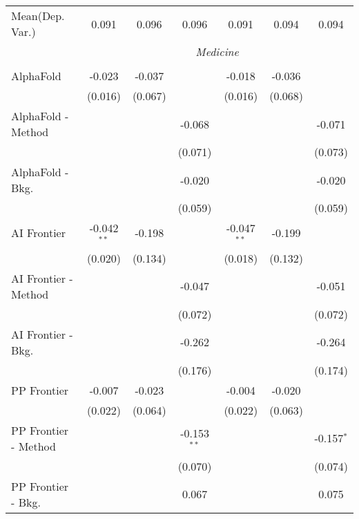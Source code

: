 \begin{tabular}{lcccccc}
Mean(Dep. Var.) & 0.091 & 0.096 & 0.096 & 0.091 & 0.094 & 0.094 \\
 & \multicolumn{6}{c}{\textit{Medicine}} \\ \\
   AlphaFold            & -0.023        & -0.037  &               & -0.018        & -0.036  &   \\   
                        & (0.016)       & (0.067) &               & (0.016)       & (0.068) &   \\   
   AlphaFold - Method   &               &         & -0.068        &               &         & -0.071\\   
                        &               &         & (0.071)       &               &         & (0.073)\\   
   AlphaFold - Bkg.     &               &         & -0.020        &               &         & -0.020\\   
                        &               &         & (0.059)       &               &         & (0.059)\\   
   AI Frontier          & -0.042$^{**}$ & -0.198  &               & -0.047$^{**}$ & -0.199  &   \\   
                        & (0.020)       & (0.134) &               & (0.018)       & (0.132) &   \\   
   AI Frontier - Method &               &         & -0.047        &               &         & -0.051\\   
                        &               &         & (0.072)       &               &         & (0.072)\\   
   AI Frontier - Bkg.   &               &         & -0.262        &               &         & -0.264\\   
                        &               &         & (0.176)       &               &         & (0.174)\\   
   PP Frontier          & -0.007        & -0.023  &               & -0.004        & -0.020  &   \\   
                        & (0.022)       & (0.064) &               & (0.022)       & (0.063) &   \\   
   PP Frontier - Method &               &         & -0.153$^{**}$ &               &         & -0.157$^{*}$\\   
                        &               &         & (0.070)       &               &         & (0.074)\\   
   PP Frontier - Bkg.   &               &         & 0.067         &               &         & 0.075\\   

\end{tabular}
